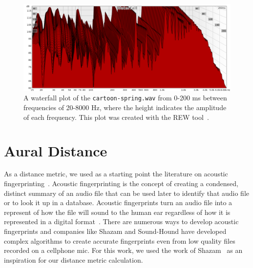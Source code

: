 
\begin{figure}[!ht]
\includegraphics[width=\textwidth]{figs/waterfall} 
\caption{A waterfall plot of the \texttt{cartoon-spring.wav} from 0-200 ms between frequencies of 20-8000 Hz, where the height indicates the amplitude of each frequency. This plot was created with the REW tool~\cite{REWTool}.}
\label{fig:waterfall}
\end{figure}

\section{Aural Distance}
\label{sec:distance}

As a distance metric, we used as a starting point the literature on acoustic fingerprinting~\cite{fingerprinting}.
Acoustic fingerprinting is the concept of creating a condensed, distinct summary of an audio file that can be used later to identify that audio file or to look it up in a database.
Acoustic fingerprints turn an audio file into a represent of how the file will sound to the human ear regardless of how it is represented in a digital format~\cite{fingerprinting}.
There are numerous ways to develop acoustic fingerprints and companies like Shazam and Sound-Hound have developed complex algorithms to create accurate fingerprints even from low quality files recorded on a cellphone mic.
For this work, we used the work of Shazam~\cite{wang2003industrial} as an inspiration for our distance metric calculation.



